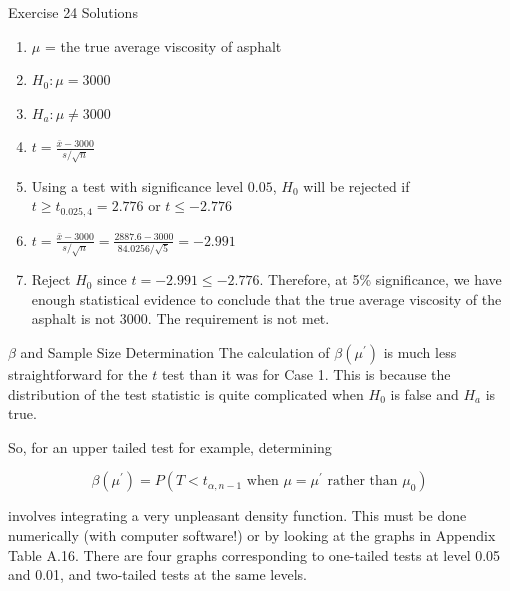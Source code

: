 \documentclass[
  ignorenonframetext,
]{beamer}
\providecommand{\tightlist}{%
  \setlength{\itemsep}{0pt}\setlength{\parskip}{0pt}}\usepackage{longtable,booktabs,array}
\begin{document}
\begin{frame}{Exercise 24 Solutions}
\protect\hypertarget{exercise-24-solutions}{}
\begin{enumerate}[<+->]
\tightlist
\item
  \(\mu\) = the true average viscosity of asphalt
\item
  \(H_{0}: \mu = 3000\)
\item
  \(H_{a}: \mu \neq 3000\)
\item
  \(t = \frac{\bar{x} - 3000}{s/\sqrt{n}}\)
\item
  Using a test with significance level \(0.05\), \(H_{0}\) will be
  rejected if \(t \geq t_{0.025, 4} = 2.776\) or \(t \leq - 2.776\)
\item
  \(t = \frac{\bar{x} - 3000}{s/\sqrt{n}} = \frac{2887.6 - 3000}{84.0256/\sqrt{5}} = -2.991\)
\item
  Reject \(H_{0}\) since \(t = -2.991 \leq -2.776\). Therefore, at 5\%
  significance, we have enough statistical evidence to conclude that the
  true average viscosity of the asphalt is not 3000. The requirement is
  not met.
\end{enumerate}
\end{frame}

\begin{frame}{\(\beta\) and Sample Size Determination}
\protect\hypertarget{beta-and-sample-size-determination-2}{}
The calculation of \(\beta(\mu^{\prime})\) is much less straightforward
for the \(t\) test than it was for Case 1. This is because the
distribution of the test statistic is quite complicated when \(H_{0}\)
is false and \(H_{a}\) is true.

So, for an upper tailed test for example, determining

\[ 
\beta(\mu^{\prime}) = P(T < t_{\alpha,n-1} \text{ when } \mu = \mu^{\prime} \text{ rather than }\mu_{0})
\]

involves integrating a very unpleasant density function. This must be
done numerically (with computer software!) or by looking at the graphs
in Appendix Table A.16. There are four graphs corresponding to
one-tailed tests at level 0.05 and 0.01, and two-tailed tests at the
same levels.
\end{frame}
\end{document}
